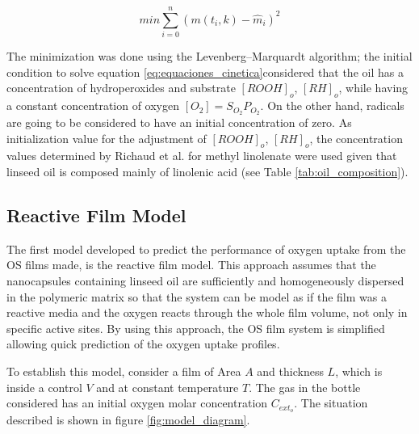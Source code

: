 \begin{refsection}
\begin{equation}
    min \sum_{i=0}^n\left(m(t_i,k)-\hat{m}_i\right)^2
    \label{eq:funcion_objetivo}
\end{equation}

The minimization was done using the Levenberg–Marquardt algorithm; the initial condition to solve equation \ref{eq:equaciones_cinetica}considered that the oil has a concentration of hydroperoxides and substrate $[ROOH]_o$, $[RH]_o$, while having a constant concentration of oxygen $[O_2]=S_{O_2}P_{O_2}$. On the other hand, radicals are going to be considered to have an initial concentration of zero. As initialization value for the adjustment of $[ROOH]_o$, $[RH]_o$, the concentration values determined by Richaud et al. \cite{Richaud2012RateChemiluminescence} for methyl linolenate were used given that linseed oil is composed mainly of linolenic acid (see Table \ref{tab:oil_composition}).


\subsection{Reactive Film Model }\label{subsec:reactive_film_met}
The first model developed to predict the performance of oxygen uptake from the OS films made, is the reactive film model. This approach assumes that the nanocapsules containing linseed oil are sufficiently and homogeneously dispersed in the polymeric matrix so that the system can be model as if the film was a reactive media and the oxygen reacts through the whole film volume, not only in specific active sites. By using this approach, the OS film system is simplified allowing quick prediction of the oxygen uptake profiles.

To establish this model, consider a film of Area $A$ and thickness $L$, which is inside a control $V$ and at constant temperature $T$. The gas in the bottle considered has an initial oxygen molar concentration $C_{ext_o}$. The situation described is shown in figure \ref{fig:model_diagram}. 



 
  \end{refsection}